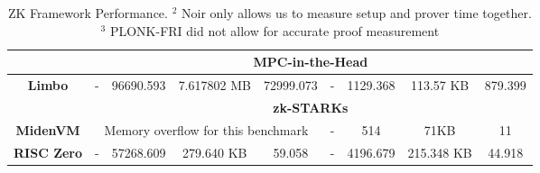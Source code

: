 \begin{table*}[htb]
{\begin{tabular}{ccccc|cccc}
   \midrule
    & \multicolumn{8}{c}{\textbf{MPC-in-the-Head}} \\
   \midrule
   \textbf{Limbo \cite{KULeuvenCOSIC2023Limbo}} & - & 96690.593 & 7.617802 MB & 72999.073 & - & 1129.368 & 113.57 KB & 879.399 \\
   \midrule

    & \multicolumn{8}{c}{\textbf{zk-STARKs}} \\
   \midrule

   \textbf{MidenVM \cite{PolygonMiden2023MidenVM}}& \multicolumn{4}{c|}{Memory overflow for this benchmark} & - & 514 & 71KB & 11 \\
   \textbf{RISC Zero \cite{RISCZero2023DeveloperDocs}} & - & 57268.609 & 279.640 KB & 59.058 & - & 4196.679 & 215.348 KB & 44.918 \\
   
   \bottomrule
   \end{tabular}}
   \caption{ZK Framework Performance. {\scriptsize $^2$ Noir only allows us to measure setup and prover time together. $^3$ PLONK-FRI did not allow for accurate proof measurement}}
   \label{tab:finalresults}
\end{table*}
